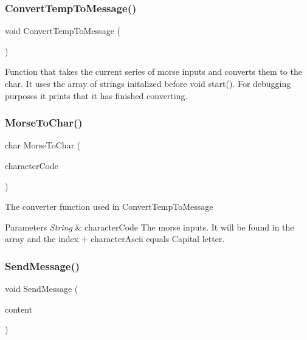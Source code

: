 \subsubsection{\texorpdfstring{ConvertTempToMessage()}{ConvertTempToMessage()}}
{\footnotesize\ttfamily void Convert\+Temp\+To\+Message (\begin{DoxyParamCaption}{ }\end{DoxyParamCaption})}

Function that takes the current series of morse inputs and converts them to the char. It uses the array of strings initalized before void start(). For debugging purposes it prints that it has finished converting. \mbox{\label{_arduino_morse_client_8ino_a3c352a3078a48318473305aa369f8c5f}} 
\subsubsection{\texorpdfstring{MorseToChar()}{MorseToChar()}}
{\footnotesize\ttfamily char Morse\+To\+Char (\begin{DoxyParamCaption}\item[{String}]{character\+Code }\end{DoxyParamCaption})}

The converter function used in Convert\+Temp\+To\+Message


\begin{DoxyParams}{Parameters}
{\em String} & character\+Code The morse inputs. It will be found in the array and the index + character\+Ascii equals Capital letter. \\
\hline
\end{DoxyParams}
\mbox{\label{_arduino_morse_client_8ino_a4b40eed9d26071a1abd196858475cb7e}} 
\subsubsection{\texorpdfstring{SendMessage()}{SendMessage()}}
{\footnotesize\ttfamily void Send\+Message (\begin{DoxyParamCaption}\item[{String}]{content }\end{DoxyParamCaption})}

